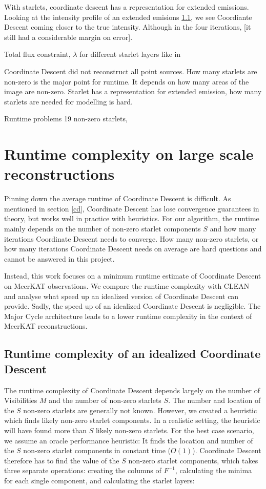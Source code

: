 With starlets, coordinate descent has a representation for extended emissions. Looking at the intensity profile of an extended emisions \ref{}, we see Coordiante Descent coming closer to the true intensity. Although in the four iterations,  [it still had a considerable margin on error]. 

Total flux constraint, $\lambda$ for different starlet layers like in \cite{girard2015sparse}

Coordinate Descent did not reconstruct all point sources. How many starlets are non-zero is the major point for runtime. It depends on how many areas of the image are non-zero. Starlet has a representation for extended emission, how many starlets are needed for modelling is hard.

Runtime problems
19 non-zero starlets, 


\pagebreak
\section{Runtime complexity on large scale reconstructions}
Pinning down the average runtime of Coordinate Descent is difficult. As mentioned in section \ref{cd}, Coordinate Descent has lose convergence guarantees in theory, but works well in practice with heuristics. For our algorithm, the runtime mainly depends on the number of non-zero starlet components $S$ and how many iterations Coordinate Descent needs to converge. How many non-zero starlets, or how many iterations Coordinate Descent needs on average are hard questions and cannot be answered in this project.

Instead, this work focuses on a minimum runtime estimate of Coordinate Descent on MeerKAT observations. We compare the runtime complexity with CLEAN and analyse what speed up an idealized version of Coordinate Descent can provide. Sadly, the speed up of an idealized Coordinate Descent is negligible. The Major Cycle architecture leads to a lower runtime complexity in the context of MeerKAT reconstructions.


\subsection{Runtime complexity of an idealized Coordinate Descent}
The runtime complexity of Coordinate Descent depends largely on the number of Visibilities $M$ and the number of non-zero starlets $S$. The number and location of the $S$ non-zero starlets are generally not known. However, we created a heuristic which finds likely non-zero starlet components. In a realistic setting, the heuristic will have found more than $S$ likely non-zero starlets. For the best case scenario, we assume an oracle performance heuristic: It finds the location and number of the $S$ non-zero starlet components in constant time ($O(1)$). Coordinate Descent therefore has to find the value of the $S$ non-zero starlet components, which takes three separate operations: creating the columns of $F^{-1}$, calculating the minima for each single component, and calculating the starlet layers:

